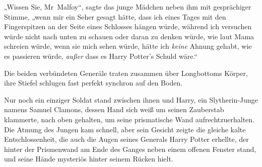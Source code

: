„Wissen Sie, Mr~Malfoy“, sagte das junge Mädchen neben ihm mit gesprächiger Stimme, „wenn mir ein Seher gesagt hätte, dass ich eines Tages mit den Fingerspitzen an der Seite eines Schlosses hängen würde, während ich versuchen würde nicht nach unten zu schauen oder daran zu denken würde, wie laut Mama schreien würde, wenn sie mich sehen würde, hätte ich \emph{keine} Ahnung gehabt, wie es passieren würde, \emph{außer} dass es Harry Potter's Schuld wäre.“


Die beiden verbündeten Generäle traten zusammen über Longbottoms Körper, ihre Stiefel schlugen fast perfekt synchron auf den Boden.

Nur noch ein einziger Soldat stand zwischen ihnen und Harry, ein Slytherin-Junge namens Samuel Clamons, dessen Hand sich weiß um seinen Zauberstab klammerte, nach oben gehalten, um seine prismatische Wand aufrechtzuerhalten. Die Atmung des Jungen kam schnell, aber sein Gesicht zeigte die gleiche kalte Entschlossenheit, die auch die Augen seines Generals Harry Potter erhellte, der hinter der Prismenwand am Ende des Ganges neben einem offenen Fenster stand, und seine Hände mysteriös hinter seinem Rücken hielt.

